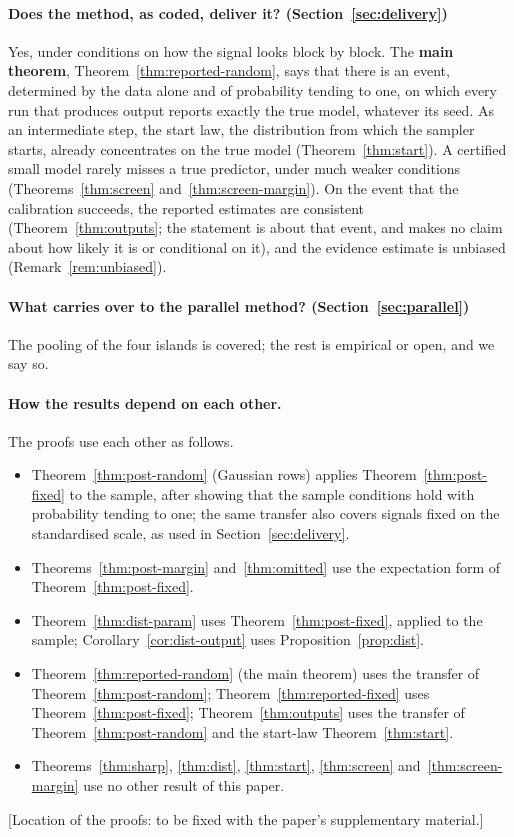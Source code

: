 \paragraph{Does the method, as coded, deliver it? (Section~\ref{sec:delivery})} Yes, under conditions on how the signal
looks block by block. The \textbf{main theorem}, Theorem~\ref{thm:reported-random}, says that there is an event,
determined by the data alone and of probability tending to one, on which every run that produces output reports exactly
the true model, whatever its seed. As an intermediate step, the start law, the distribution from which the sampler starts, already
concentrates on the true model (Theorem~\ref{thm:start}). A certified small model rarely misses a true predictor, under much weaker conditions
(Theorems~\ref{thm:screen} and~\ref{thm:screen-margin}). On the event that the calibration succeeds, the reported
estimates are consistent (Theorem~\ref{thm:outputs}; the statement is about that event, and makes no claim about how
likely it is or conditional on it), and the evidence estimate is unbiased (Remark~\ref{rem:unbiased}).

\paragraph{What carries over to the parallel method? (Section~\ref{sec:parallel})} The pooling of the four islands is
covered; the rest is empirical or open, and we say so.

\paragraph{How the results depend on each other.} The proofs use each other as follows.
\begin{itemize}[leftmargin=1.5em,itemsep=1pt]
  \item Theorem~\ref{thm:post-random} (Gaussian rows) applies Theorem~\ref{thm:post-fixed} to the sample, after showing that
    the sample conditions hold with probability tending to one; the same transfer also covers signals fixed on the
    standardised scale, as used in Section~\ref{sec:delivery}.
  \item Theorems~\ref{thm:post-margin} and~\ref{thm:omitted} use the expectation form of Theorem~\ref{thm:post-fixed}.
  \item Theorem~\ref{thm:dist-param} uses Theorem~\ref{thm:post-fixed}, applied to the sample; Corollary~\ref{cor:dist-output}
    uses Proposition~\ref{prop:dist}.
  \item Theorem~\ref{thm:reported-random} (the main theorem) uses the transfer of Theorem~\ref{thm:post-random};
    Theorem~\ref{thm:reported-fixed} uses Theorem~\ref{thm:post-fixed}; Theorem~\ref{thm:outputs} uses the transfer of
    Theorem~\ref{thm:post-random} and the start-law Theorem~\ref{thm:start}.
  \item Theorems~\ref{thm:sharp}, \ref{thm:dist}, \ref{thm:start}, \ref{thm:screen} and~\ref{thm:screen-margin} use no
    other result of this paper.
\end{itemize} [Location of the proofs: to be fixed with the paper's supplementary material.]

